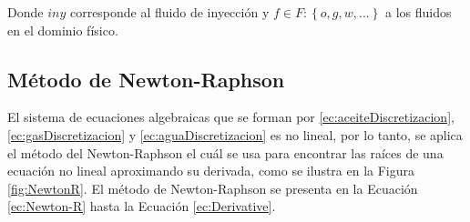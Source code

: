 Donde $iny$ corresponde al fluido de inyección y $f \in F:\left\lbrace o,g,w,... \right\rbrace$ a los fluidos en el dominio físico.

\subsection{Método de Newton-Raphson}\label{subsec:N-R}
%
El sistema de ecuaciones algebraicas que se forman por \ref{ec:aceiteDiscretizacion}, \ref{ec:gasDiscretizacion} y \ref{ec:aguaDiscretizacion} es no lineal, por lo tanto, se aplica el método del Newton-Raphson el cuál se usa para encontrar las raíces de una ecuación no lineal aproximando su derivada, como se ilustra en la Figura \ref{fig:NewtonR}.
El método de Newton-Raphson se presenta en la Ecuación \ref{ec:Newton-R} hasta la Ecuación \ref{ec:Derivative}.

